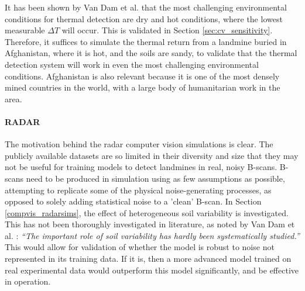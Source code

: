             It has been shown by Van Dam et al. \cite{van2003effects} that the most challenging environmental conditions for thermal detection are dry and hot conditions, where the lowest measurable \(\Delta T\) will occur. This is validated in Section \ref{sec:cv_sensitivity}. Therefore, it suffices to simulate the thermal return from a landmine buried in Afghanistan, where it is hot, and the soils are sandy, to validate that the thermal detection system will work in even the most challenging environmental conditions. Afghanistan is also relevant because it is one of the most densely mined countries in the world, with a large body of humanitarian work in the area.
        
        \paragraph{RADAR} 

            \noindent The motivation behind the radar computer vision simulations is clear. The publicly available datasets are so limited in their diversity and size that they may not be useful for training models to detect landmines in real, noisy B-scans. B-scans need to be produced in simulation using as few assumptions as possible, attempting to replicate some of the physical noise-generating processes, as opposed to solely adding statistical noise to a 'clean' B-scan. In Section \ref{compvis_radarsims}, the effect of heterogeneous soil variability is investigated. This has not been thoroughly investigated in literature, as noted by Van Dam et al. \cite{van2003effects}: \textit{“The important role of soil variability has hardly been systematically studied.”}
            This would allow for validation of whether the model is robust to noise not represented in its training data. If it is, then a more advanced model trained on real experimental data would outperform this model significantly, and be effective in operation.
    
    
    
